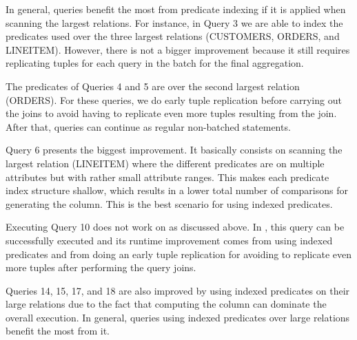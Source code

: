 In general, queries benefit the most from predicate indexing if it is applied
when scanning the largest relations. For instance, in Query 3 we are able to
index the predicates used over the three largest relations (CUSTOMERS, ORDERS,
and LINEITEM). However, there is not a bigger improvement because it
still requires replicating tuples for each query in the batch for the final
aggregation.

The predicates of Queries 4 and 5 are over the second largest relation (ORDERS).
For these queries, we do early tuple replication before carrying out the
joins to avoid having to replicate even more tuples resulting from
the join. After that, queries can continue as regular non-batched statements.

Query 6 presents the biggest improvement. It basically consists on scanning the
largest relation (LINEITEM) where the different predicates are on multiple
attributes but with rather small attribute ranges. This makes each predicate
index structure shallow, which results in a lower total number of
comparisons for generating the \qset column. This is the best scenario for using
indexed predicates.

Executing Query 10 does not work on \bigquery as discussed above. In \athena, this query can be
successfully executed and its runtime improvement comes from using indexed
predicates and from doing an early tuple replication for avoiding to replicate
even more tuples after performing the query joins.

Queries 14, 15, 17, and 18 are also improved by using indexed predicates on their
large relations due to the fact that computing the \qset column can
dominate the overall execution. In general, queries using indexed predicates
over large relations benefit the most from it.

